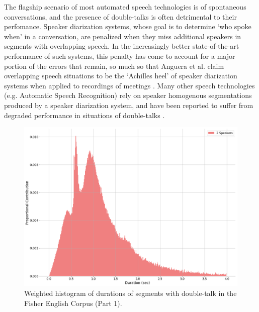 \documentclass[a4paper]{article}
\begin{document}
The flagship scenario of most automated speech technologies is of spontaneous conversations,
and the presence of double-talks is often detrimental to their perfomance.
Speaker diarization systems, whose goal is to determine `who spoke when' in a conversation,
are penalized when they miss additional speakers in segments with overlapping speech.
In the increasingly better state-of-the-art performance of such systems,
this penalty has come to account for a major portion of the errors that remain,
so much so that Anguera et al. claim overlapping speech situations to be the `Achilles heel' of speaker diarization systems when applied to recordings of meetings \cite{anguera_speaker_2012}.
Many other speech technologies (e.g. Automatic Speech Recognition) rely on speaker homogenous segmentations produced by a speaker diarization system,
and have been reported to suffer from degraded performance in situations of double-talks \cite{cetin_speaker_2006}.
\begin{figure}[t] \label{fig:dt-dist}
  \centering
  \includegraphics[width=\linewidth]{figures/dt-dist.png}
  \caption{Weighted histogram of durations of segments with double-talk in the Fisher English Corpus (Part 1).}
\end{figure}
\end{document}
